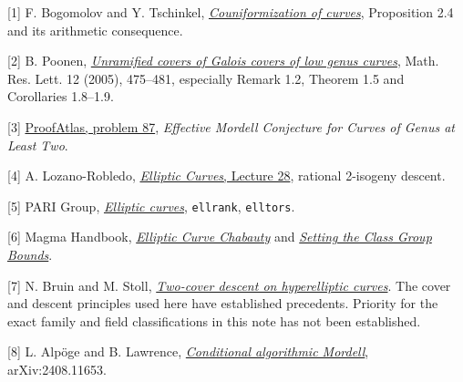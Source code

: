 \documentclass[12pt]{article}
\newcommand{\sub}[1]{\par\smallskip{\bfseries\color{green}#1}\par}
\begin{document}
\sub{References}
{\small
[1] F. Bogomolov and Y. Tschinkel, \href{https://math.nyu.edu/~tschinke/papers/yuri/04covers/cover4.pdf}{\emph{Couniformization of curves}}, Proposition 2.4 and its arithmetic consequence.

[2] B. Poonen, \href{https://math.mit.edu/~poonen/papers/etale.pdf}{\emph{Unramified covers of Galois covers of low genus curves}}, Math. Res. Lett. 12 (2005), 475--481, especially Remark 1.2, Theorem 1.5 and Corollaries 1.8--1.9.

[3] \href{https://www.proofatlas.ai/open-problems/}{ProofAtlas, problem 87}, \emph{Effective Mordell Conjecture for Curves of Genus at Least Two}.

[4] A. Lozano-Robledo, \href{https://alozano.clas.uconn.edu/wp-content/uploads/sites/490/2021/04/MATH-5020-Elliptic-Curves-Lecture-28.pdf}{\emph{Elliptic Curves}, Lecture 28}, rational 2-isogeny descent.

[5] PARI Group, \href{https://pari.math.u-bordeaux.fr/dochtml/html/Elliptic_curves.html}{\emph{Elliptic curves}}, \texttt{ellrank}, \texttt{elltors}.

[6] Magma Handbook, \href{https://magma.maths.usyd.edu.au/magma/handbook/text/1568}{\emph{Elliptic Curve Chabauty}} and \href{https://magma.maths.usyd.edu.au/magma/handbook/text/416}{\emph{Setting the Class Group Bounds}}.

[7] N. Bruin and M. Stoll, \href{https://www.mathe2.uni-bayreuth.de/stoll/papers/twocoverdescent.pdf}{\emph{Two-cover descent on hyperelliptic curves}}. The cover and descent principles used here have established precedents. Priority for the exact family and field classifications in this note has not been established.

[8] L. Alpöge and B. Lawrence, \href{https://arxiv.org/abs/2408.11653}{\emph{Conditional algorithmic Mordell}}, arXiv:2408.11653.}
\end{document}
